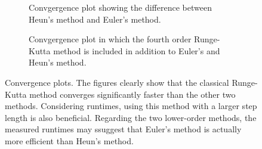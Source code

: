 \documentclass{article}
\begin{document}
\begin{figure}
    \centering
    
\end{figure}

\begin{figure}
    \centering
    
\end{figure}

\begin{figure}
    \centering
    
\end{figure}

\begin{figure}[htbp]
    \centering
    \begin{subfigure}[t]{0.4\textwidth}
            
        \label{fig:convergence_plot}
        \caption{Convgergence plot showing the difference between Heun's method and Euler's method.}
    \end{subfigure}
    \hfill
    \begin{subfigure}[t]{0.4\textwidth}
            
        \label{fig:convergence_plot_all}
        \caption{Convgergence plot in which the fourth order Runge-Kutta method is included in addition to Euler's and Heun's method.}
    \end{subfigure}
    \caption{Convergence plots. The figures clearly show that the classical Runge-Kutta method converges significantly faster than the other two methods. Considering runtimes, using this method with a larger step length is also beneficial. Regarding the two lower-order methods, the measured runtimes may ssuggest that Euler's method is actually more efficient than Heun's method.}
\end{figure}
\end{document}
